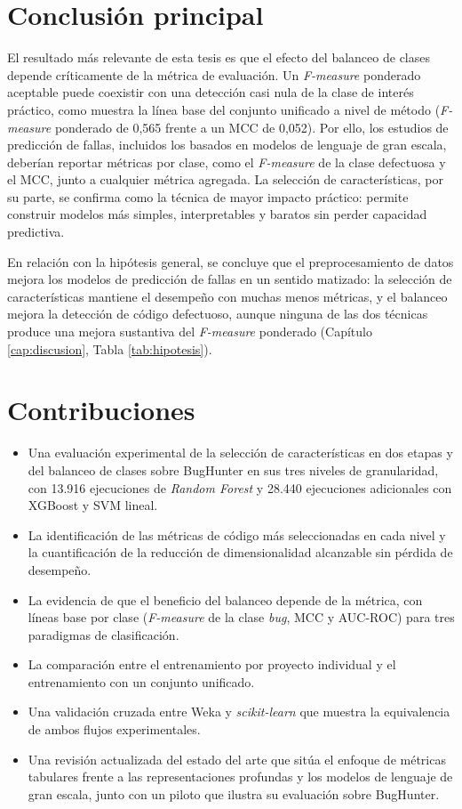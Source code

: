 \section*{Conclusión principal}

El resultado más relevante de esta tesis es que el efecto del balanceo de clases depende críticamente de la métrica de evaluación. Un \textit{F-measure} ponderado aceptable puede coexistir con una detección casi nula de la clase de interés práctico, como muestra la línea base del conjunto unificado a nivel de método (\textit{F-measure} ponderado de 0,565 frente a un MCC de 0,052). Por ello, los estudios de predicción de fallas, incluidos los basados en modelos de lenguaje de gran escala, deberían reportar métricas por clase, como el \textit{F-measure} de la clase defectuosa y el MCC, junto a cualquier métrica agregada. La selección de características, por su parte, se confirma como la técnica de mayor impacto práctico: permite construir modelos más simples, interpretables y baratos sin perder capacidad predictiva.

En relación con la hipótesis general, se concluye que el preprocesamiento de datos mejora los modelos de predicción de fallas en un sentido matizado: la selección de características mantiene el desempeño con muchas menos métricas, y el balanceo mejora la detección de código defectuoso, aunque ninguna de las dos técnicas produce una mejora sustantiva del \textit{F-measure} ponderado (Capítulo \ref{cap:discusion}, Tabla \ref{tab:hipotesis}).

\section*{Contribuciones}

\begin{itemize}
    \item Una evaluación experimental de la selección de características en dos etapas y del balanceo de clases sobre BugHunter en sus tres niveles de granularidad, con 13.916 ejecuciones de \textit{Random Forest} y 28.440 ejecuciones adicionales con XGBoost y SVM lineal.
    \item La identificación de las métricas de código más seleccionadas en cada nivel y la cuantificación de la reducción de dimensionalidad alcanzable sin pérdida de desempeño.
    \item La evidencia de que el beneficio del balanceo depende de la métrica, con líneas base por clase (\textit{F-measure} de la clase \textit{bug}, MCC y AUC-ROC) para tres paradigmas de clasificación.
    \item La comparación entre el entrenamiento por proyecto individual y el entrenamiento con un conjunto unificado.
    \item Una validación cruzada entre Weka y \textit{scikit-learn} que muestra la equivalencia de ambos flujos experimentales.
    \item Una revisión actualizada del estado del arte que sitúa el enfoque de métricas tabulares frente a las representaciones profundas y los modelos de lenguaje de gran escala, junto con un piloto que ilustra su evaluación sobre BugHunter.
\end{itemize}

